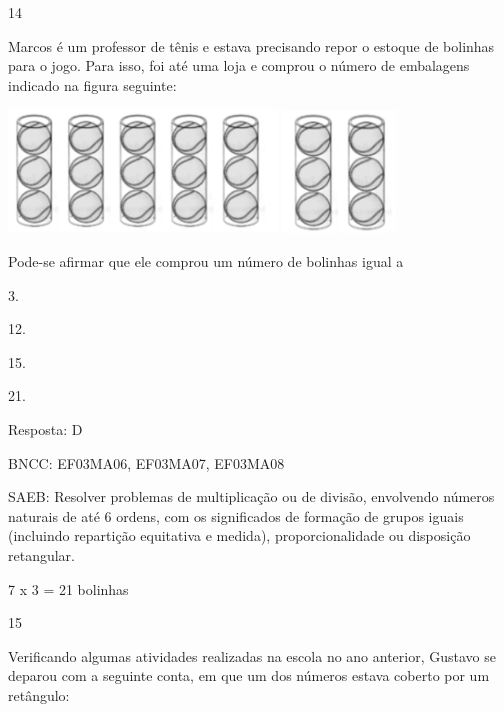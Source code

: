 \begin{escolha}
{\begin{escolha}
{\num{14}

Marcos é um professor de tênis e estava precisando repor o estoque de
bolinhas para o jogo. Para isso, foi até uma loja e comprou o número de
embalagens indicado na figura seguinte:


\includegraphics[width=2.80882in,height=1.29243in]{media/image139.png}
\includegraphics[width=1.18628in,height=1.28713in]{media/image140.png}

Pode-se afirmar que ele comprou um número de bolinhas igual a

\begin{escolha}

\item
  3.
\item
  12.
\item
  15.
\item
  21.
\end{escolha}

Resposta: D

BNCC: EF03MA06, EF03MA07, EF03MA08

SAEB: Resolver problemas de multiplicação ou de divisão,
envolvendo números naturais de até 6 ordens, com os significados de
formação de grupos iguais (incluindo repartição equitativa e medida),
proporcionalidade ou disposição retangular.

7 x 3 = 21 bolinhas

\num{15}

Verificando algumas atividades realizadas na escola no ano anterior, Gustavo se deparou com a seguinte conta, em que um dos números estava
coberto por um retângulo:


}
\end{escolha}}
\end{escolha}
